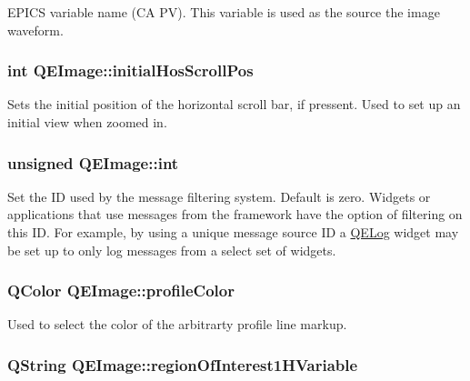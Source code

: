 \label{classQEImage_a4387f3f14b3384ce8f48400047aa70d1}
EPICS variable name (CA PV). This variable is used as the source the image waveform. \hypertarget{classQEImage_ab73dc427e7df7dacbdd4ca1a5df84eab}{
\subsubsection[{initialHosScrollPos}]{\setlength{\rightskip}{0pt plus 5cm}int QEImage::initialHosScrollPos}}
\label{classQEImage_ab73dc427e7df7dacbdd4ca1a5df84eab}
Sets the initial position of the horizontal scroll bar, if pressent. Used to set up an initial view when zoomed in. \hypertarget{classQEImage_ad4c74aff58e2a7a9ae21980613599708}{
\subsubsection[{int}]{\setlength{\rightskip}{0pt plus 5cm}unsigned QEImage::int}}
\label{classQEImage_ad4c74aff58e2a7a9ae21980613599708}
Set the ID used by the message filtering system. Default is zero. Widgets or applications that use messages from the framework have the option of filtering on this ID. For example, by using a unique message source ID a \hyperlink{classQELog}{QELog} widget may be set up to only log messages from a select set of widgets. \hypertarget{classQEImage_a51e836fac19a11f9199791c40e27b850}{
\subsubsection[{profileColor}]{\setlength{\rightskip}{0pt plus 5cm}QColor QEImage::profileColor}}
\label{classQEImage_a51e836fac19a11f9199791c40e27b850}
Used to select the color of the arbitrarty profile line markup. \hypertarget{classQEImage_a0918d2df76f4fc169173847db08b9ecf}{
\subsubsection[{regionOfInterest1HVariable}]{\setlength{\rightskip}{0pt plus 5cm}QString QEImage::regionOfInterest1HVariable}}
